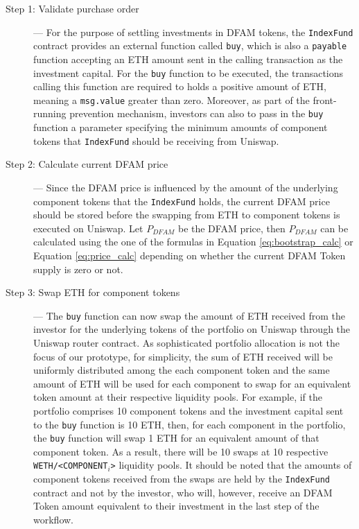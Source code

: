 \begin{description}
  \item[Step 1: Validate purchase order] --- For the purpose of settling investments in DFAM tokens, the \texttt{IndexFund} contract provides an external function called \texttt{buy}, which is also a \texttt{payable} function accepting an ETH amount sent in the calling transaction as the investment capital. For the \texttt{buy} function to be executed, the transactions calling this function are required to holds a positive amount of ETH, meaning a \texttt{msg.value} greater than zero. Moreover, as part of the front-running prevention mechanism, investors can also to pass in the \texttt{buy} function a parameter specifying the minimum amounts of component tokens that \texttt{IndexFund} should be receiving from Uniswap.

  \item[Step 2: Calculate current DFAM price] ---  Since the DFAM price is influenced by the amount of the underlying component tokens that the \texttt{IndexFund} holds, the current DFAM price should be stored before the swapping from ETH to component tokens is executed on Uniswap. Let $P_{DFAM}$ be the DFAM price, then $P_{DFAM}$ can be calculated using the one of the formulas in Equation \ref{eq:bootstrap_calc} or Equation \ref{eq:price_calc} depending on whether the current DFAM Token supply is zero or not.
  

  \item[Step 3: Swap ETH for component tokens] --- The \texttt{buy} function can now swap the amount of ETH received from the investor for the underlying tokens of the portfolio on Uniswap through the Uniswap router contract. As sophisticated portfolio allocation is not the focus of our prototype, for simplicity, the sum of ETH received will be uniformly distributed among the each component token and the same amount of ETH will be used for each component to swap for an equivalent token amount at their respective liquidity pools. For example, if the portfolio comprises 10 component tokens and the investment capital sent to the \texttt{buy} function is 10 ETH, then, for each component in the portfolio, the \texttt{buy} function will swap 1 ETH for an equivalent amount of that component token. As a result, there will be 10 swaps at 10 respective \texttt{WETH/<COMPONENT$_i$>} liquidity pools. It should be noted that the amounts of component tokens received from the swaps are held by the \texttt{IndexFund} contract and not by the investor, who will, however, receive an DFAM Token amount equivalent to their investment in the last step of the workflow.
  

\end{description}

